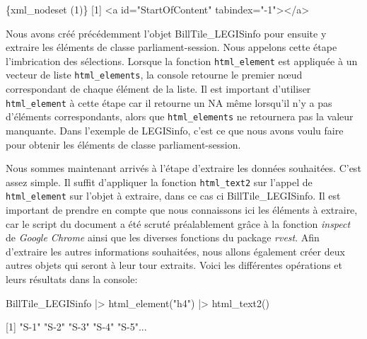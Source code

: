 \documentclass[
  letterpaper,
  DIV=11,
  numbers=noendperiod,
  oneside]{scrreprt}
\newenvironment{Shaded}{\begin{snugshade}}{\end{snugshade}}
\newcommand{\ErrorTok}[1]{\textcolor[rgb]{0.68,0.00,0.00}{#1}}
\newcommand{\ExtensionTok}[1]{\textcolor[rgb]{0.00,0.23,0.31}{#1}}
\newcommand{\KeywordTok}[1]{\textcolor[rgb]{0.00,0.23,0.31}{#1}}
\newcommand{\NormalTok}[1]{\textcolor[rgb]{0.00,0.23,0.31}{#1}}
\newcommand{\OperatorTok}[1]{\textcolor[rgb]{0.37,0.37,0.37}{#1}}
\newcommand{\StringTok}[1]{\textcolor[rgb]{0.13,0.47,0.30}{#1}}
\begin{document}
\begin{Shaded}
\begin{Highlighting}[]
\ExtensionTok{\{xml\_nodeset} \ErrorTok{(}\ExtensionTok{1}\KeywordTok{)}\ErrorTok{\}}
\ExtensionTok{[1]} \OperatorTok{\textless{}}\NormalTok{a id=}\StringTok{"StartOfContent"}\NormalTok{ tabindex=}\StringTok{"{-}1"}\OperatorTok{\textgreater{}\textless{}}\NormalTok{/a}\OperatorTok{\textgreater{}}
\end{Highlighting}
\end{Shaded}

Nous avons créé précédemment l'objet BillTile\_LEGISinfo pour ensuite y
extraire les éléments de classe parliament-session. Nous appelons cette
étape l'imbrication des sélections. Lorsque la fonction
\texttt{html\_element} est appliquée à un vecteur de liste
\texttt{html\_elements}, la console retourne le premier nœud
correspondant de chaque élément de la liste. Il est important d'utiliser
\texttt{html\_element} à cette étape car il retourne un NA même
lorsqu'il n'y a pas d'éléments correspondants, alors que
\texttt{html\_elements} ne retournera pas la valeur manquante. Dans
l'exemple de LEGISinfo, c'est ce que nous avons voulu faire pour obtenir
les éléments de classe parliament-session.

Nous sommes maintenant arrivés à l'étape d'extraire les données
souhaitées. C'est assez simple. Il suffit d'appliquer la fonction
\texttt{html\_text2} sur l'appel de \texttt{html\_element} sur l'objet à
extraire, dans ce cas ci BillTile\_LEGISinfo. Il est important de
prendre en compte que nous connaissons ici les éléments à extraire, car
le script du document a été scruté préalablement grâce à la fonction
\emph{inspect} de \emph{Google Chrome} ainsi que les diverses fonctions
du package \emph{rvest}. Afin d'extraire les autres informations
souhaitées, nous allons également créer deux autres objets qui seront à
leur tour extraits. Voici les différentes opérations et leurs résultats
dans la console:

\begin{Shaded}
\begin{Highlighting}[]
\ExtensionTok{BillTile\_LEGISinfo} \KeywordTok{|}\OperatorTok{\textgreater{}}\NormalTok{ html\_element}\KeywordTok{(}\StringTok{"h4"}\KeywordTok{)} \KeywordTok{|}\OperatorTok{\textgreater{}}\NormalTok{ html\_text2}\KeywordTok{()}
\end{Highlighting}
\end{Shaded}

\begin{Shaded}
\begin{Highlighting}[]
\ExtensionTok{[1]} \StringTok{"S{-}1"}   \StringTok{"S{-}2"}   \StringTok{"S{-}3"}   \StringTok{"S{-}4"}   \StringTok{"S{-}5"}\NormalTok{...}
\end{Highlighting}
\end{Shaded}
\end{document}
